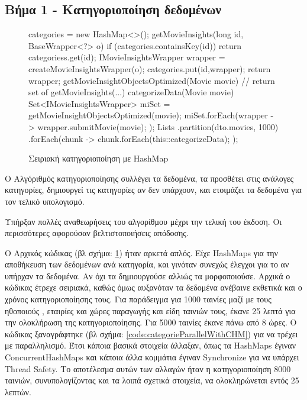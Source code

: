 \subsection{Βήμα 1 - Κατηγοριοποίηση δεδομένων}
\begin{figure}[H]
    \begin{javacode}
    categories = new HashMap<>();
    getMovieInsights(long id, BaseWrapper<?> o) {
        if (categories.containsKey(id)) {
            return categoriess.get(id);
        }
        IMovieInsightsWrapper wrapper = createMovieInsightsWrapper(o);
        categories.put(id,wrapper);
        return wrapper;
    }
    getMovieInsightObjectsOptimized(Movie movie) {
     // return set of getMovieInsights(...)
    }
    categorizeData(Movie movie) {
        Set<IMovieInsightsWrapper> miSet = getMovieInsightObjectsOptimized(movie);
        miSet.forEach(wrapper -> {
            wrapper.submitMovie(movie);
        });
    }
    Lists
      .partition(dto.movies, 1000)
      .forEach(chunk -> {
         chunk.forEach(this::categorizeData);
      });
    \end{javacode}
    \caption{Σειριακή κατηγοριοποίηση με HashMap}
   \label{code:categorieSerialWithHM}
\end{figure}
Ο Αλγόριθμός κατηγοριοποίησης συλλέγει τα δεδομένα, τα προσθέτει στις ανάλογες κατηγορίες, δημιουργεί τις κατηγορίες αν δεν υπάρχουν, και ετοιμάζει τα δεδομένα για τον τελικό υπολογισμό.

Υπήρξαν πολλές αναθεωρήσεις του αλγορίθμου μέχρι την τελική του έκδοση. Οι περισσότερες αφορούσαν βελτιστοποιήσεις απόδοσης. 

Ο Αρχικός κώδικας (βλ σχήμα: \ref{code:categorieSerialWithHM}) ήταν αρκετά απλός. Είχε HashMaps για την αποθήκευση των δεδομένων ανά κατηγορία, και γινόταν συνεχώς έλεγχοι για το αν υπήρχαν  τα δεδομένα. Αν όχι τα δημιουργούσε αλλιώς τα μορφοποιούσε.
Αρχικά ο κώδικας έτρεχε σειριακά, καθώς όμως αυξανόταν τα δεδομένα ανέβαινε εκθετικά και ο χρόνος κατηγοριοποίησης τους. Για παράδειγμα για 1000 ταινίες μαζί με τους ηθοποιούς , εταιρίες και χώρες παραγωγής και είδη ταινιών τους, έκανε 25 λεπτά για την ολοκλήρωση της κατηγοριοποίησης. Για 5000 ταινίες έκανε πάνω από 8 ώρες. 
Ο κώδικας ξαναγράφτηκε (βλ σχήμα: \ref{code:categorieParallelWithCHM}) για να τρέχει με παραλληλισμό. Έτσι κάποια βασικά στοιχεία άλλαξαν, όπως τα HashMaps έγιναν ConcurrentHashMaps και κάποια άλλα κομμάτια έγιναν Synchronize για να υπάρχει Thread Safety. Το αποτέλεσμα αυτών των αλλαγών ήταν η κατηγοριοποίηση 8000 ταινιών, συνυπολογίζοντας και τα λοιπά σχετικά στοιχεία, να ολοκληρώνεται εντός 25 λεπτών.

